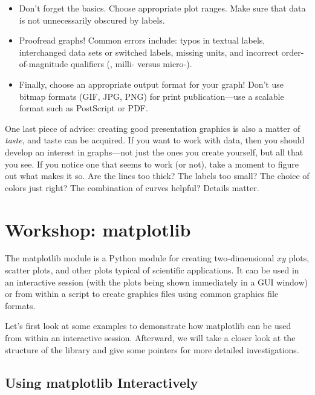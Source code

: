 \begin{itemize}
\item Don't forget the basics. Choose appropriate plot ranges. Make
  sure that data is not unnecessarily obscured by labels.

\item Proofread graphs! Common errors include: typos in textual
  labels, interchanged data sets or switched labels, missing units,
  and incorrect order-of-magnitude qualifiers (\eg, milli- versus
  micro-).

\item Finally, choose an appropriate output format for your graph!
  Don't use bitmap formats (GIF, JPG, PNG) for print publication---use
  a scalable format such as PostScript or PDF.
\end{itemize}

One last piece of advice: creating good presentation graphics is also
a matter of \emph{taste}, and taste can be acquired. If you want to
work with data, then you should develop an interest in graphs---not
just the ones you create yourself, but all that you see. If you notice
one that seems to work (or not), take a moment to figure out what
makes it so. Are the lines too thick? The labels too small? The choice
of colors just right? The combination of curves helpful? Details
matter.

\section{Workshop: matplotlib}

  
The matplotlib module is a Python module for creating two-dimensional
$xy$ plots, scatter plots, and other plots typical of scientific
applications. It can be\vadjust{\pagebreak} used in an interactive session (with the plots
being shown immediately in a GUI window) or from within a script to
create graphics files using common graphics file formats.

Let's first look at some examples to demonstrate how matplotlib can be
used from within an interactive session. Afterward, we will take a
closer look at the structure of the library and give some pointers for
more detailed investigations.

\subsection{Using matplotlib Interactively}

